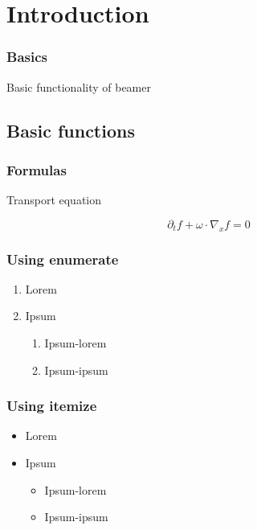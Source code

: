 \documentclass{beamer}
\begin{document}
\section{Introduction}

\begin{frame}
	\frametitle{Basics}
Basic functionality of beamer
	
\end{frame}



\subsection{Basic functions}

\begin{frame}
	\frametitle{Formulas}
	Transport equation

	\begin{center}
		 \[\partial_t f+\omega\cdot\nabla_x f =0\]
	\end{center}

\end{frame}

\begin{frame}
\frametitle{Using enumerate}
\begin{enumerate}
\item Lorem 
\item Ipsum
\begin{enumerate}
\item Ipsum-lorem
\item Ipsum-ipsum
\end{enumerate}
\end{enumerate}

\end{frame}

\begin{frame}
\frametitle{Using itemize}
\begin{itemize}
\item Lorem 
\item Ipsum
\begin{itemize}
\item Ipsum-lorem
\item Ipsum-ipsum
\end{itemize}
\end{itemize}
\end{frame}
\end{document}
